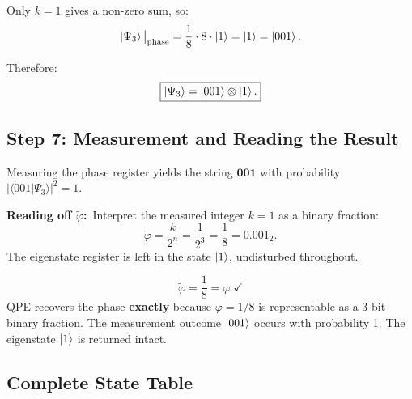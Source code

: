 \documentclass[12pt,a4paper]{article}
\newcommand{\QPE}{\textsc{QPE}}
\begin{document}
Only $k=1$ gives a non-zero sum, so:
\[
  \Ket{\Psi_3}\big|_\text{phase} = \frac{1}{8}\cdot 8\cdot\Ket{1} = \Ket{1} = \Ket{001}.
\]

Therefore:
\[
  \boxed{\Ket{\Psi_3} = \Ket{001}\otimes\Ket{1}.}
\]

\subsection{Step 7: Measurement and Reading the Result}

Measuring the phase register yields the string $\mathbf{001}$ with probability $|\langle 001 | \Psi_3\rangle|^2 = 1$.

\medskip
\noindent\textbf{Reading off $\tilde\varphi$:}\ Interpret the measured integer
$k=1$ as a binary fraction:
\[
  \tilde\varphi = \frac{k}{2^n} = \frac{1}{2^3} = \frac{1}{8} = 0.001_2.
\]
The eigenstate register is left in the state $\Ket{1}$, undisturbed throughout.

\begin{tcolorbox}[example, title={Result}]
  \[
    \boxed{\tilde\varphi = \frac{1}{8} = \varphi \;\checkmark}
  \]
  \QPE{} recovers the phase \textbf{exactly} because $\varphi = 1/8$ is
  representable as a 3-bit binary fraction.  The measurement outcome
  $\Ket{001}$ occurs with probability 1.  The eigenstate $\Ket{1}$
  is returned intact.
\end{tcolorbox}

\subsection{Complete State Table}
\end{document}

